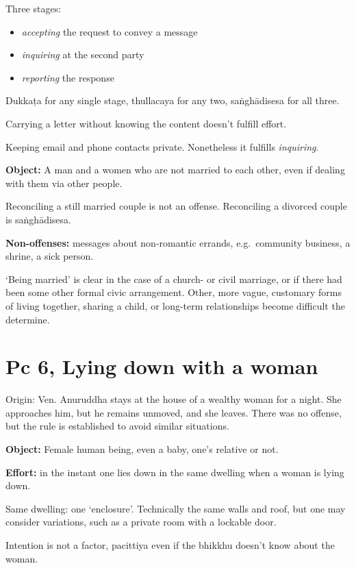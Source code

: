 Three stages:

\begin{itemize}
\tightlist
\item
  \emph{accepting} the request to convey a message
\item
  \emph{inquiring} at the second party
\item
  \emph{reporting} the response
\end{itemize}

Dukkaṭa for any single stage, thullacaya for any two, saṅghādisesa for
all three.

Carrying a letter without knowing the content doesn't fulfill effort.

Keeping email and phone contacts private. Nonetheless it fulfills
\emph{inquiring}.

\textbf{Object:} A man and a women who are not married to each other,
even if dealing with them via other people.

Reconciling a still married couple is not an offense. Reconciling a
divorced couple is saṅghādisesa.

\enlargethispage{2\baselineskip}

\textbf{Non-offenses:} messages about non-romantic errands,
e.g.~community business, a shrine, a sick person.

`Being married' is clear in the case of a church- or civil marriage, or
if there had been some other formal civic arrangement. Other, more
vague, customary forms of living together, sharing a child, or long-term
relationships become difficult the determine.

\section{Pc 6, Lying down with a woman}

Origin: Ven. Anuruddha stays at the house of a wealthy woman for a
night. She approaches him, but he remains unmoved, and she leaves. There
was no offense, but the rule is established to avoid similar situations.

\textbf{Object:} Female human being, even a baby, one's relative or not.

\textbf{Effort:} in the instant one lies down in the same dwelling when
a woman is lying down.

Same dwelling: one `enclosure'. Technically the same walls and roof, but
one may consider variations, such as a private room with a lockable
door.

Intention is not a factor, pacittiya even if the bhikkhu doesn't know
about the woman.

